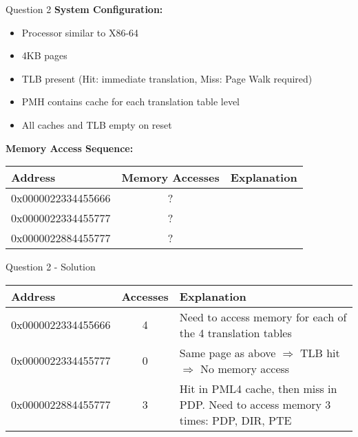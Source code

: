 \documentclass[aspectratio=169,12pt]{beamer}
\begin{document}
\begin{frame}{Question 2}
\textbf{System Configuration:}
\begin{itemize}
    \item Processor similar to X86-64
    \item 4KB pages
    \item TLB present (Hit: immediate translation, Miss: Page Walk required)
    \item PMH contains cache for each translation table level
    \item All caches and TLB empty on reset
\end{itemize}

\vspace{1em}
\textbf{Memory Access Sequence:}
\begin{center}
\begin{tabular}{|l|c|l|}
\hline
\textbf{Address} & \textbf{Memory Accesses} & \textbf{Explanation} \\
\hline
0x0000022334455666 & ? & \\
0x0000022334455777 & ? & \\
0x0000022884455777 & ? & \\
\hline
\end{tabular}
\end{center}
\end{frame}

\begin{frame}{Question 2 - Solution}
\begin{center}
\begin{tabular}{|l|c|p{6cm}|}
\hline
\textbf{Address} & \textbf{Accesses} & \textbf{Explanation} \\
\hline
0x0000022334455666 & 4 & Need to access memory for each of the 4 translation tables \\
\hline
0x0000022334455777 & 0 & Same page as above $\Rightarrow$ TLB hit $\Rightarrow$ No memory access \\
\hline
0x0000022884455777 & 3 & Hit in PML4 cache, then miss in PDP. Need to access memory 3 times: PDP, DIR, PTE \\
\hline
\end{tabular}
\end{center}
\end{frame}
\end{document}
